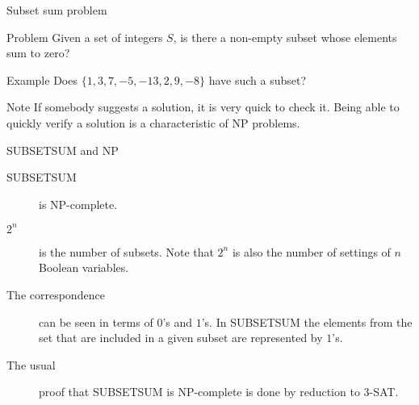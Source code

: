 \begin{frame}{Subset sum problem}
  
  \begin{alertblock}{Problem}
    Given a set of integers $S$, is there a non-empty subset whose elements sum to zero?
  \end{alertblock}

  \vspace{4mm}
  
  \begin{exampleblock}{Example}
    Does $\{ 1, 3, 7, -5, -13, 2, 9, -8 \}$ have such a subset?
  \end{exampleblock}
  
  \vspace{4mm}

  \begin{alertblock}{Note}
     If somebody suggests a solution, it is very quick to check it.
    Being able to quickly verify a solution is a characteristic of NP problems.
  \end{alertblock}
\end{frame}





\begin{frame}{SUBSETSUM and NP}
  \begin{description}
    \item[SUBSETSUM] is NP-complete.
    \item[$2^n$] is the number of subsets. Note that $2^n$ is also the number of settings of $n$ Boolean variables.
    \item[The correspondence] can be seen in terms of $0$'s and $1$'s. In SUBSETSUM the elements from the set that are included in a given subset are represented by $1$'s.
    \item[The usual] proof that SUBSETSUM is NP-complete is done by reduction to 3-SAT.
  \end{description}
\end{frame}
